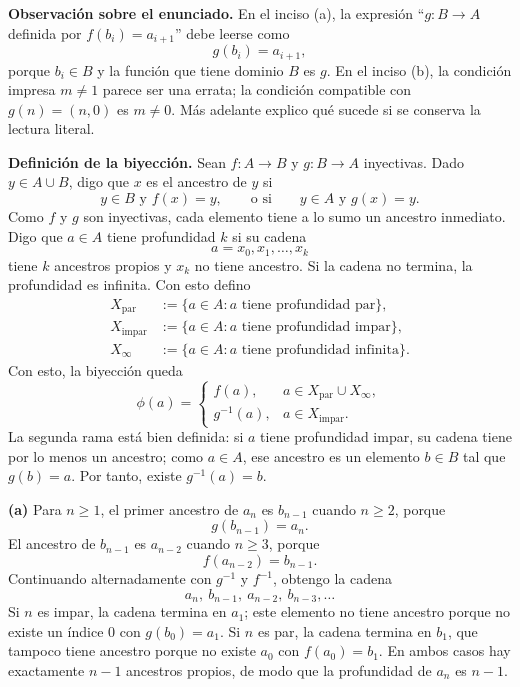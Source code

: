 \documentclass[11pt]{article}
\begin{document}
\begin{solution}

\textbf{Observación sobre el enunciado.} En el inciso (a), la expresión
``$g:B\to A$ definida por $f(b_i)=a_{i+1}$'' debe leerse como
\[
g(b_i)=a_{i+1},
\]
porque $b_i\in B$ y la función que tiene dominio $B$ es $g$. En el inciso (b),
la condición impresa $m\neq1$ parece ser una errata; la condición compatible
con $g(n)=(n,0)$ es $m\neq0$. Más adelante explico qué sucede si se conserva
la lectura literal.

\textbf{Definición de la biyección.} Sean $f:A\to B$ y $g:B\to A$ inyectivas.
Dado $y\in A\cup B$, digo que $x$ es el ancestro de $y$ si
\[
y\in B\text{ y }f(x)=y,
\qquad\text{o si}\qquad
y\in A\text{ y }g(x)=y.
\]
Como $f$ y $g$ son inyectivas, cada elemento tiene a lo sumo un ancestro inmediato.
Digo que $a\in A$ tiene profundidad $k$ si su cadena
\[
a=x_0,x_1,\ldots,x_k
\]
tiene $k$ ancestros propios y $x_k$ no tiene ancestro. Si la cadena no termina,
la profundidad es infinita. Con esto defino
\begin{align*}
X_{\mathrm{par}}&:=\{a\in A:a\text{ tiene profundidad par}\},\\
X_{\mathrm{impar}}&:=\{a\in A:a\text{ tiene profundidad impar}\},\\
X_{\infty}&:=\{a\in A:a\text{ tiene profundidad infinita}\}.
\end{align*}
Con esto, la biyección queda
\[
\boxed{
\phi(a)=
\begin{cases}
f(a),&a\in X_{\mathrm{par}}\cup X_{\infty},\\
g^{-1}(a),&a\in X_{\mathrm{impar}}.
\end{cases}}
\]
La segunda rama está bien definida: si $a$ tiene profundidad impar, su cadena
tiene por lo menos un ancestro; como $a\in A$, ese ancestro es un elemento
$b\in B$ tal que $g(b)=a$. Por tanto, existe $g^{-1}(a)=b$.

\textbf{(a)} Para $n\geq1$, el primer ancestro de $a_n$ es $b_{n-1}$ cuando
$n\geq2$, porque
\[
g(b_{n-1})=a_n.
\]
El ancestro de $b_{n-1}$ es $a_{n-2}$ cuando $n\geq3$, porque
\[
f(a_{n-2})=b_{n-1}.
\]
Continuando alternadamente con $g^{-1}$ y $f^{-1}$, obtengo la cadena
\[
a_n,\ b_{n-1},\ a_{n-2},\ b_{n-3},\ldots
\]
Si $n$ es impar, la cadena termina en $a_1$; este elemento no tiene ancestro
porque no existe un índice $0$ con $g(b_0)=a_1$. Si $n$ es par, la cadena
termina en $b_1$, que tampoco tiene ancestro porque no existe $a_0$ con
$f(a_0)=b_1$. En ambos casos hay exactamente $n-1$ ancestros propios, de modo
que la profundidad de $a_n$ es $n-1$.


\end{solution}
\end{document}
